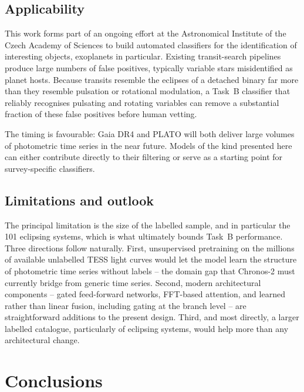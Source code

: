 \documentclass{aa}
\begin{document}
    \subsection{Applicability}

    This work forms part of an ongoing effort at the Astronomical Institute of the Czech
    Academy of Sciences to build automated classifiers for the identification of interesting
    objects, exoplanets in particular. Existing transit-search pipelines produce large
    numbers of false positives, typically variable stars misidentified as planet hosts.
    Because transits resemble the eclipses of a detached binary far more than they resemble
    pulsation or rotational modulation, a Task~B classifier that reliably recognises
    pulsating and rotating variables can remove a substantial fraction of these false
    positives before human vetting.

    The timing is favourable: Gaia DR4 \citep{Prusti2016} and PLATO \citep{Rauer2025} will
    both deliver large volumes of photometric time series in the near future. Models of the
    kind presented here can either contribute directly to their filtering or serve as a
    starting point for survey-specific classifiers.

    \subsection{Limitations and outlook}

    The principal limitation is the size of the labelled sample, and in particular the 101
    eclipsing systems, which is what ultimately bounds Task~B performance. Three directions
    follow naturally. First, unsupervised pretraining on the millions of available unlabelled
    TESS light curves would let the model learn the structure of photometric time series
    without labels -- the domain gap that Chronos-2 must currently bridge from generic time
    series. Second, modern architectural components -- gated feed-forward networks,
    FFT-based attention, and learned rather than linear fusion, including gating at the
    branch level -- are straightforward additions to the present design. Third, and most
    directly, a larger labelled catalogue, particularly of eclipsing systems, would help more
    than any architectural change.



    \section{Conclusions}
    \label{sec:conclusions}
\end{document}
